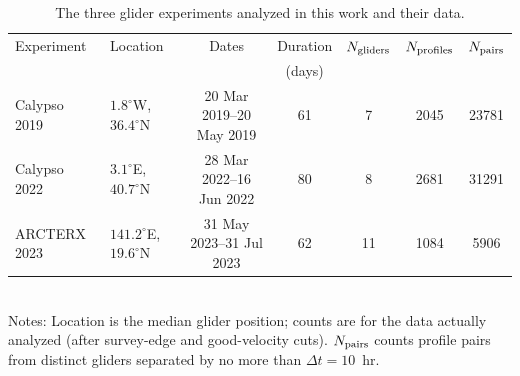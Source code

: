 \begin{table}
\centering
\caption{The three glider experiments analyzed in this work and their data. \label{tab:experiments}}
\begin{tabular}{llccccc}
\hline 
Experiment & Location & Dates & Duration & $N_{\rm gliders}$ & $N_{\rm profiles}$ & $N_{\rm pairs}$ \\ 
 & & & (days) & & & \\ 
\hline 
Calypso 2019 & $1.8^\circ$W, $36.4^\circ$N & 20 Mar 2019--20 May 2019 & 61 & 7 & 2045 & 23781 \\ 
Calypso 2022 & $3.1^\circ$E, $40.7^\circ$N & 28 Mar 2022--16 Jun 2022 & 80 & 8 & 2681 & 31291 \\ 
ARCTERX 2023 & $141.2^\circ$E, $19.6^\circ$N & 31 May 2023--31 Jul 2023 & 62 & 11 & 1084 & 5906 \\ 
\hline 
\end{tabular} 
\\ 
Notes: Location is the median glider position; counts are for the data actually analyzed (after survey-edge and good-velocity cuts). $N_{\rm pairs}$ counts profile pairs from distinct gliders separated by no more than $\Delta t = 10$~hr. \\ 
\end{table} 
